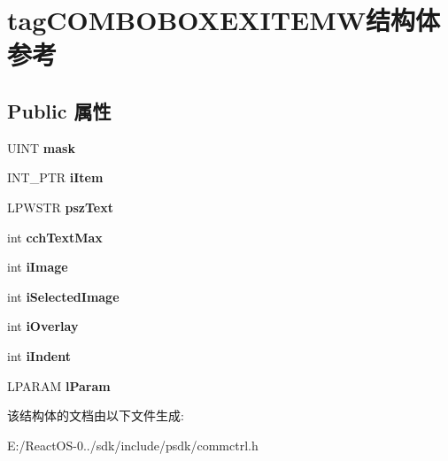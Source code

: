 \hypertarget{structtag_c_o_m_b_o_b_o_x_e_x_i_t_e_m_w}{}\section{tag\+C\+O\+M\+B\+O\+B\+O\+X\+E\+X\+I\+T\+E\+M\+W结构体 参考}
\label{structtag_c_o_m_b_o_b_o_x_e_x_i_t_e_m_w}
\subsection*{Public 属性}
\begin{DoxyCompactItemize}
\item 
\mbox{\label{structtag_c_o_m_b_o_b_o_x_e_x_i_t_e_m_w_a269878da0230dac2d866c05057c33aa0}} 
U\+I\+NT {\bfseries mask}
\item 
\mbox{\label{structtag_c_o_m_b_o_b_o_x_e_x_i_t_e_m_w_a65ad332a02ae456959e7ac61f251c7f4}} 
I\+N\+T\+\_\+\+P\+TR {\bfseries i\+Item}
\item 
\mbox{\label{structtag_c_o_m_b_o_b_o_x_e_x_i_t_e_m_w_a1f1f474fb90aa67399d66b1e7d998f8b}} 
L\+P\+W\+S\+TR {\bfseries psz\+Text}
\item 
\mbox{\label{structtag_c_o_m_b_o_b_o_x_e_x_i_t_e_m_w_a7bd0de185b88b2c22c52f76f53641ecf}} 
int {\bfseries cch\+Text\+Max}
\item 
\mbox{\label{structtag_c_o_m_b_o_b_o_x_e_x_i_t_e_m_w_aab921e1733a69e30c09256810788148b}} 
int {\bfseries i\+Image}
\item 
\mbox{\label{structtag_c_o_m_b_o_b_o_x_e_x_i_t_e_m_w_a84fb154ac814aa329caf8580c145c66c}} 
int {\bfseries i\+Selected\+Image}
\item 
\mbox{\label{structtag_c_o_m_b_o_b_o_x_e_x_i_t_e_m_w_a4c031710a3f8831e25e918c030df9361}} 
int {\bfseries i\+Overlay}
\item 
\mbox{\label{structtag_c_o_m_b_o_b_o_x_e_x_i_t_e_m_w_adb19dba5897305ef7e534614774838bf}} 
int {\bfseries i\+Indent}
\item 
\mbox{\label{structtag_c_o_m_b_o_b_o_x_e_x_i_t_e_m_w_a293e697d8a2840ec5e3cbb5a5863b7d9}} 
L\+P\+A\+R\+AM {\bfseries l\+Param}
\end{DoxyCompactItemize}


该结构体的文档由以下文件生成\+:\begin{DoxyCompactItemize}
\item 
E\+:/\+React\+O\+S-\/0../sdk/include/psdk/commctrl.\+h\end{DoxyCompactItemize}
